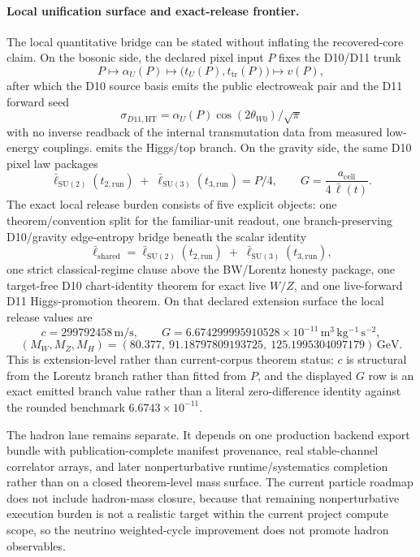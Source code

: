\documentclass[11pt]{article}
\newcommand{\ellbar}{\bar{\ell}}
\begin{document}
\paragraph{Local unification surface and exact-release frontier.}
The local quantitative bridge can be stated without inflating the recovered-core claim. On the
bosonic side, the declared pixel input \(P\) fixes the D10/D11 trunk
\[
P\longmapsto \alpha_U(P) \longmapsto \bigl(t_U(P),t_{\mathrm{tr}}(P)\bigr)\longmapsto v(P),
\]
after which the D10 source basis emits the public electroweak pair and the D11 forward seed
\[
\sigma_{D11,\mathrm{HT}}
=
\alpha_U(P)\cos(2\theta_{W0})/\sqrt{\pi}
\]
with no inverse readback of the internal transmutation data from measured low-energy couplings.
emits the Higgs/top branch. On the gravity side, the same D10 pixel law packages
\[
\ellbar_{\mathrm{SU(2)}}(t_{2,\mathrm{run}})
\;+\;
\ellbar_{\mathrm{SU(3)}}(t_{3,\mathrm{run}})
=
P/4,
\qquad
G=\frac{a_{\mathrm{cell}}}{4\,\ellbar(t)}.
\]
The exact local release burden consists of five explicit objects: one theorem/convention split for
the familiar-unit readout, one branch-preserving D10/gravity
edge-entropy bridge beneath the scalar identity
\[
\ellbar_{\mathrm{shared}}
=
\ellbar_{\mathrm{SU(2)}}(t_{2,\mathrm{run}})
\;+\;
\ellbar_{\mathrm{SU(3)}}(t_{3,\mathrm{run}}),
\]
one strict classical-regime clause above the BW/Lorentz honesty package, one target-free D10
chart-identity theorem for exact live \(W/Z\), and one live-forward D11 Higgs-promotion theorem.
On that declared extension surface the local release values are
\[
c=299792458\,\mathrm{m/s},
\qquad
G=6.674299995910528\times10^{-11}\,\mathrm{m^3\,kg^{-1}\,s^{-2}},
\]
\[
(M_W,M_Z,M_H)=
(80.377,\ 91.18797809193725,\ 125.1995304097179)\,\mathrm{GeV}.
\]
This is extension-level rather than current-corpus theorem status: \(c\) is structural from the
Lorentz branch rather than fitted from \(P\), and the displayed \(G\) row is an exact emitted
branch value rather than a literal zero-difference identity against the rounded benchmark
\(6.6743\times10^{-11}\).

The hadron lane remains separate. It depends on one production backend export bundle with publication-complete manifest provenance, real stable-channel correlator arrays, and later nonperturbative runtime/systematics completion rather than on a closed theorem-level mass surface. The current particle roadmap does not include hadron-mass closure, because that remaining nonperturbative execution burden is not a realistic target within the current project compute scope, so the neutrino weighted-cycle improvement does not promote hadron observables.
\end{document}
